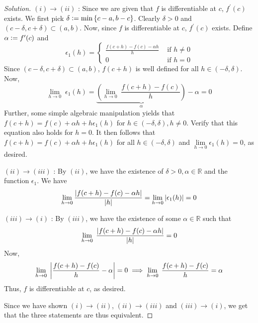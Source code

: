\documentclass[12pt]{article}
\def\ddfrac#1#2{\displaystyle\frac{\displaystyle #1}{\displaystyle #2}}
\theoremstyle{definition}
\newenvironment{soln}{\begin{proof}[Solution]}{\end{proof}}
\begin{document}
\begin{enumerate}[leftmargin=*]
\begin{soln}
        $(i) \to (ii)$ : Since we are given that $f$ is differentiable at $c$, $f^{\prime}(c)$ exists. We first pick $\delta \vcentcolon= \min\left\{c-a, b-c\right\}$. Clearly $\delta>0$ and $(c-\delta, c+\delta) \subset (a,b)$. Now, since $f$ is differentiable at $c$, $f^{\prime}(c)$ exists. Define $\alpha \vcentcolon= f^{\prime}(c)$ and 
        \[
            \epsilon_1(h) = \begin{cases}
                \ddfrac{f(c+h) - f(c) - \alpha h}{h} & \text{ if } h \neq 0 \\
                0 & \text{ if } h = 0
            \end{cases}
        \]
        Since $(c-\delta, c+\delta) \subset (a,b)$, $f(c+h)$ is well defined for all $h \in (-\delta, \delta)$. Now, 
        \[
            \lim_{h \to 0} \; \epsilon_1(h) = \underbrace{\left( \lim_{h \to 0} \; \frac{f(c+h) - f(c)}{h} \right)}_{\alpha} - \alpha = 0
        \]
        Further, some simple algebraic manipulation yields that $f(c+h) = f(c) + \alpha h + h\epsilon_1(h)$ for $h \in (-\delta, \delta), h \neq 0$. Verify that this equation also holds for $h=0$. It then follows that $f(c+h) = f(c) + \alpha h + h\epsilon_1(h)$ for all $h \in (-\delta, \delta)$ and $\lim\limits_{h \to 0} \epsilon_1(h) = 0$, as desired.
        
        \medskip
        
        $(ii) \to (iii)$ : By $(ii)$, we have the existence of $\delta>0, \alpha \in \mathbb{R}$ and the function $\epsilon_1$. We have
        \[
            \lim_{h \to 0} \frac{\abs{f(c+h) - f(c) - \alpha h}}{\abs{h}} = \lim_{h \to 0} \abs{\epsilon_1(h)} = 0
        \]
        
        \medskip
        
        $(iii) \to (i)$ : By $(iii)$, we have the existence of some $\alpha \in \mathbb{R}$ such that
        \[
            \lim_{h \to 0} \; \frac{\abs{f(c+h) - f(c) - \alpha h}}{\abs{h}} = 0
        \]
        Now, 
        \[
            \lim_{h \to 0} \; \abs{\frac{f(c+h) - f(c)}{h} - \alpha} = 0 \implies \lim_{h \to 0} \; \frac{f(c+h) - f(c)}{h} = \alpha
        \]
        Thus, $f$ is differentiable at $c$, as desired.
        \medskip
        
        Since we have shown $(i) \to (ii)$, $(ii) \to (iii)$ and $(iii) \to (i)$, we get that the three statements are thus equivalent.
    \end{soln}
    

\end{enumerate}
\end{document}
